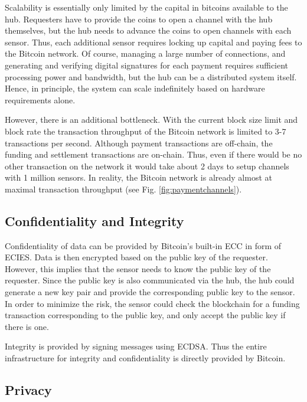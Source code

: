 Scalability is essentially only limited by the capital in bitcoins available to the hub. Requesters have to provide the coins to open a channel with the hub themselves, but the hub needs to advance the coins to open channels with each sensor. Thus, each additional sensor requires locking up capital and paying fees to the Bitcoin network. Of course, managing a large number of connections, and generating and verifying digital signatures for each payment requires sufficient processing power and bandwidth, but the hub can be a distributed system itself. Hence, in principle, the system can scale indefinitely based on hardware requirements alone.

However, there is an additional bottleneck. With the current block size limit and block rate the transaction throughput of the Bitcoin network is limited to 3-7 transactions per second. Although payment transactions are off-chain, the funding and settlement transactions are on-chain. Thus, even if there would be no other transaction on the network it would take about 2 days to setup channels with 1 million sensors. In reality, the Bitcoin network is already almost at maximal transaction throughput (see Fig. \ref{fig:paymentchannels}).

\subsection{Confidentiality and Integrity}

Confidentiality of data can be provided by Bitcoin's built-in \ac{ECC} in form of \ac{ECIES}. Data is then encrypted based on the public key of the requester. However, this implies that the sensor needs to know the public key of the requester. Since the public key is also communicated via the hub, the hub could generate a new key pair and provide the corresponding public key to the sensor. In order to minimize the risk, the sensor could check the blockchain for a funding transaction corresponding to the public key, and only accept the public key if there is one.

Integrity is provided by signing messages using \ac{ECDSA}. Thus the entire infrastructure for integrity and confidentiality is directly provided by Bitcoin.

\subsection{Privacy}  

